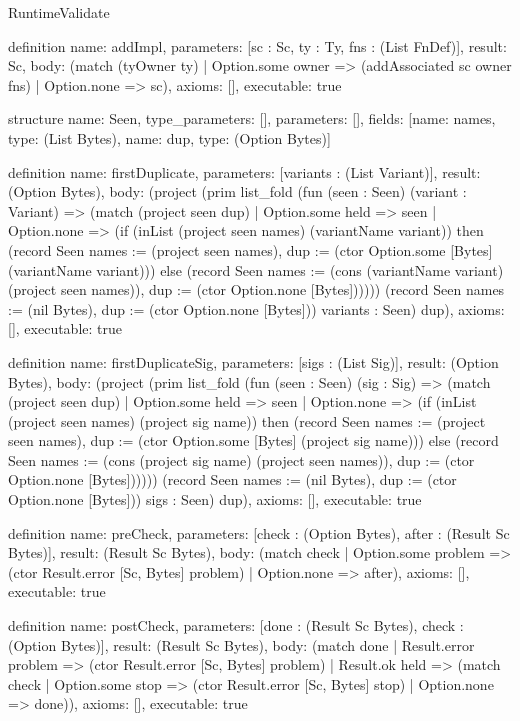 \begin{lexlean}{RuntimeValidate}
\begin{semanticmodule}
definition{
  name: addImpl,
  parameters: [sc : Sc, ty : Ty, fns : (List FnDef)],
  result: Sc,
  body: (match (tyOwner ty)
    | Option.some owner => (addAssociated sc owner fns)
    | Option.none => sc),
  axioms: [],
  executable: true
}

structure{
  name: Seen,
  type_parameters: [],
  parameters: [],
  fields: [{name: names, type: (List Bytes)}, {name: dup, type: (Option Bytes)}]
}

definition{
  name: firstDuplicate,
  parameters: [variants : (List Variant)],
  result: (Option Bytes),
  body: (project (prim list_fold (fun (seen : Seen) (variant : Variant) => (match (project seen dup)
    | Option.some held => seen
    | Option.none => (if (inList (project seen names) (variantName variant)) then (record Seen {names := (project seen names), dup := (ctor Option.some [Bytes] (variantName variant))}) else (record Seen {names := (cons (variantName variant) (project seen names)), dup := (ctor Option.none [Bytes])})))) (record Seen {names := (nil Bytes), dup := (ctor Option.none [Bytes])}) variants : Seen) dup),
  axioms: [],
  executable: true
}

definition{
  name: firstDuplicateSig,
  parameters: [sigs : (List Sig)],
  result: (Option Bytes),
  body: (project (prim list_fold (fun (seen : Seen) (sig : Sig) => (match (project seen dup)
    | Option.some held => seen
    | Option.none => (if (inList (project seen names) (project sig name)) then (record Seen {names := (project seen names), dup := (ctor Option.some [Bytes] (project sig name))}) else (record Seen {names := (cons (project sig name) (project seen names)), dup := (ctor Option.none [Bytes])})))) (record Seen {names := (nil Bytes), dup := (ctor Option.none [Bytes])}) sigs : Seen) dup),
  axioms: [],
  executable: true
}

definition{
  name: preCheck,
  parameters: [check : (Option Bytes), after : (Result Sc Bytes)],
  result: (Result Sc Bytes),
  body: (match check
    | Option.some problem => (ctor Result.error [Sc, Bytes] problem)
    | Option.none => after),
  axioms: [],
  executable: true
}

definition{
  name: postCheck,
  parameters: [done : (Result Sc Bytes), check : (Option Bytes)],
  result: (Result Sc Bytes),
  body: (match done
    | Result.error problem => (ctor Result.error [Sc, Bytes] problem)
    | Result.ok held => (match check
      | Option.some stop => (ctor Result.error [Sc, Bytes] stop)
      | Option.none => done)),
  axioms: [],
  executable: true
}


\end{semanticmodule}
\end{lexlean}
